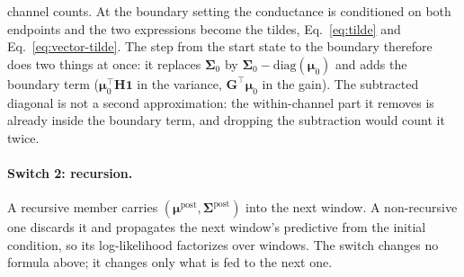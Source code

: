 \begin{appendixbox}
channel counts.
At the boundary setting the
conductance is conditioned on both endpoints and the two expressions become the tildes,
Eq.~\ref{eq:tilde} and Eq.~\ref{eq:vector-tilde}. The step from the start state to the
boundary therefore does two things at once: it replaces $\boldsymbol{\Sigma}_0$ by
$\boldsymbol{\Sigma}_0-\mathrm{diag}(\boldsymbol{\mu}_0)$ and adds the boundary term ($\boldsymbol{\mu}_0^\top
\mathbf{H}\mathbf{1}$ in the variance, $\mathbf{G}^\top\boldsymbol{\mu}_0$ in the gain). The
subtracted diagonal is not a second approximation: the within-channel part it removes is
already inside the boundary term, and dropping the subtraction would count it twice.

\paragraph{Switch 2: recursion.} A recursive member carries
$(\boldsymbol{\mu}^{\mathrm{post}}, \boldsymbol{\Sigma}^{\mathrm{post}})$ into the next window. A
non-recursive one discards it and propagates the next window's predictive from the initial
condition, so its log-likelihood factorizes over windows. The switch changes no formula
above; it changes only what is fed to the next one.


\end{appendixbox}
